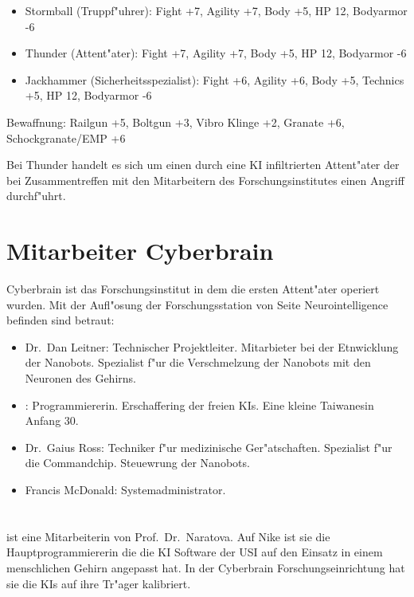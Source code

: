 \begin{itemize}
    \item Stormball (Truppf"uhrer): Fight +7, Agility +7, Body +5, HP 12, Bodyarmor -6
    \item Thunder (Attent"ater): Fight +7, Agility +7, Body +5, HP 12, Bodyarmor -6
    \item Jackhammer (Sicherheitsspezialist): Fight +6, Agility +6, Body +5, Technics +5, HP 12, Bodyarmor -6
\end{itemize}

Bewaffnung: Railgun +5, Boltgun +3, Vibro Klinge +2, Granate +6, Schockgranate/EMP +6 

Bei Thunder handelt es sich um einen durch eine KI infiltrierten Attent"ater der bei Zusammentreffen mit den 
Mitarbeitern des Forschungsinstitutes einen Angriff durchf"uhrt.

\renewcommand{\ml}{\pinyin{Mailin2}}

\section{Mitarbeiter Cyberbrain}

Cyberbrain ist das Forschungsinstitut in dem die ersten Attent"ater operiert wurden. Mit der Aufl"osung der Forschungsstation von Seite Neurointelligence befinden sind betraut:

\begin{itemize}
    \item Dr.~Dan Leitner: Technischer Projektleiter. Mitarbieter bei der Etnwicklung der Nanobots. Spezialist f"ur die Verschmelzung 
        der  Nanobots mit den Neuronen des Gehirns.
    \item \ml{}: Programmiererin. Erschaffering der freien KIs. Eine kleine Taiwanesin Anfang 30. 
    \item Dr.~Gaius Ross: Techniker f"ur medizinische Ger"atschaften. Spezialist f"ur die Commandchip. Steuewrung der Nanobots.
    \item Francis McDonald: Systemadministrator.
\end{itemize}

\newpage
\section[Mailin]{\ml{}}

\ml{} ist eine Mitarbeiterin von Prof.~Dr.~Naratova. Auf Nike ist sie die Hauptprogrammiererin die die KI Software der USI auf den Einsatz in einem menschlichen Gehirn angepasst hat.  In der Cyberbrain Forschungseinrichtung hat sie die KIs auf ihre Tr"ager kalibriert.

